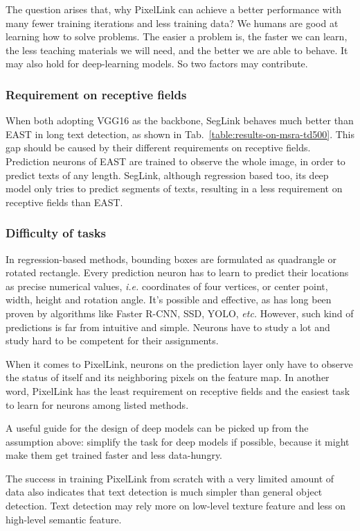 \documentclass[letterpaper]{article} \usepackage{aaai18}  \usepackage{times}  \usepackage{helvet}  \usepackage{courier}  \usepackage{url}  \usepackage{graphicx}
\begin{document}
	
	The question arises that, why PixelLink can achieve a better performance with many fewer training iterations and less training data?  We humans are good at learning how to solve problems. The easier a problem is, the faster we can learn, the less teaching materials we will need, and the better we are able to behave. It may also hold for deep-learning models. So two factors may contribute.
	
	\subsubsection{Requirement on receptive fields}When both adopting VGG16 as the backbone, SegLink behaves much better than EAST in long text detection, as shown in Tab.~\ref{table:results-on-msra-td500}. This gap should be caused by their different requirements on receptive fields. Prediction neurons of EAST are trained to observe the whole image, in order to predict texts of any length. SegLink, although regression based too, its deep model only tries to predict segments of texts, resulting in a less requirement on receptive fields than EAST.
	
	\subsubsection{Difficulty of tasks}In regression-based methods, bounding boxes are formulated as quadrangle or rotated rectangle. Every prediction neuron has to learn to predict their locations as precise numerical values, \emph{i.e.} coordinates of four vertices, or center point, width, height and rotation angle. It's possible and effective, as has long been proven by algorithms like Faster R-CNN, SSD, YOLO, \emph{etc.} However, such kind of predictions is far from intuitive and simple. Neurons have to study a lot and study hard to be competent for their assignments.
	
	When it comes to PixelLink, neurons on the prediction layer only have to observe the status of itself and its neighboring pixels on the feature map. In another word, PixelLink has the least requirement on receptive fields and the easiest task to learn for neurons among listed methods.
	
	A useful guide for the design of deep models can be picked up from the assumption above: simplify the task for deep models if possible, because it might make them get trained faster and less data-hungry.
	
	The success in training PixelLink from scratch with a very limited amount of data also indicates that text detection is much simpler than general object detection. Text detection may rely more on low-level texture feature and less on high-level semantic feature.
	
\end{document}
